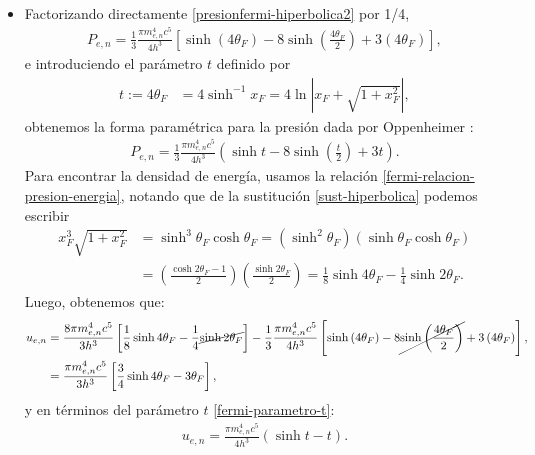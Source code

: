 \begin{itemize}
 \item Factorizando directamente \eqref{presionfermi-hiperbolica2} por 1/4,
\begin{align}
 P_{e,n}=\frac{1}{3}\frac{\pi m_{e,n}^4c^5}{4h^3}\left[\sinh\left(4\theta_F\right)-8\sinh\left(\frac{4\theta_F}{2}\right)+3\left(4\theta_F\right)\right],
\end{align}
e introduciendo el parámetro $t$ definido por
\begin{align}\label{fermi-parametro-t}
 t:=4\theta_F&=4\sinh^{-1}x_F=4\ln\left|x_F+\sqrt{1+x_F^2}\right|,
\end{align}
obtenemos la forma paramétrica para la presión dada por Oppenheimer \cite{Oppenheimer39enero}:
\begin{align}\label{fermi-presion-OV}
 \boxed{P_{e,n}=\frac{1}{3}\frac{\pi m_{e,n}^4c^5}{4h^3}\left(\sinh t-8\sinh\left(\frac{t}{2}\right)+3t\right).}
\end{align}
Para encontrar la densidad de energía, usamos la relación \eqref{fermi-relacion-presion-energia}, notando que de la sustitución \eqref{sust-hiperbolica} podemos escribir
\begin{align}
 x_F^3\sqrt{1+x_F^2}&=\sinh^3\theta_F\cosh\theta_F=\left(\sinh^2\theta_F\right)\left(\sinh\theta_F \cosh\theta_F\right)\\
&=\left(\frac{\cosh 2\theta_F-1}{2}\right)\left(\frac{\sinh 2\theta_F}{2}\right)
=\frac{1}{8}\sinh4\theta_F-\frac{1}{4}\sinh2\theta_F.
\end{align}
Luego, obtenemos que:
\begin{align}
u_{e,n}&=\frac{8\pi m_{e,n}^4c^5}{3h^3}\left[\frac{1}{8}\sinh4\theta_F-\frac{1}{4}\cancel{\sinh2\theta_F}\right]-\frac{1}{3}\frac{\pi m_{e,n}^4c^5}{4h^3}\left[\sinh\left(4\theta_F\right)-8\cancel{\sinh\left(\frac{4\theta_F}{2}\right)}+3\left(4\theta_F\right)\right],\\
&=\frac{\pi m_{e,n}^4c^5}{3h^3}\left[\frac{3}{4}\sinh 4\theta_F-3\theta_F\right],
\end{align}
y en términos del parámetro $t$ \eqref{fermi-parametro-t}:
\begin{align}\label{fermi-energia-OV}
 \boxed{u_{e,n}=\frac{\pi m_{e,n}^4c^5}{4h^3}(\sinh t-t).}
\end{align}


\end{itemize}
